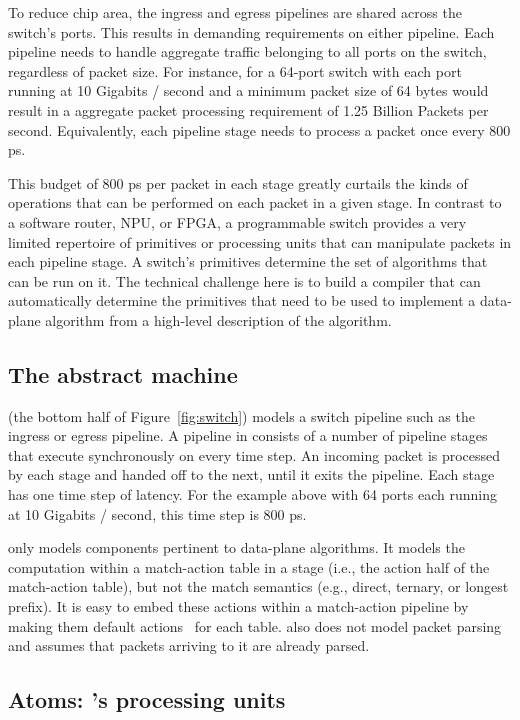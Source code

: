 To reduce chip area, the ingress and egress pipelines are shared across the
switch's ports. This results in demanding requirements on either pipeline.
Each pipeline needs to handle aggregate traffic belonging to all ports on the
switch, regardless of packet size. For instance, for a 64-port switch with each
port running at 10 Gigabits / second and a minimum packet size of 64 bytes
would result in a aggregate packet processing requirement of 1.25 Billion
Packets per second. Equivalently, each pipeline stage needs to process a packet
once every 800 ps.

This budget of 800 ps per packet in each stage greatly curtails the kinds of
operations that can be performed on each packet in a given stage. In contrast
to a software router, NPU, or FPGA, a programmable switch provides a very
limited repertoire of primitives or processing units that can manipulate
packets in each pipeline stage. A switch's primitives determine the set of
algorithms that can be run on it. The technical challenge here is to build a
compiler that can automatically determine the primitives that need to be used
to implement a data-plane algorithm from a high-level description of the
algorithm.

\subsection{The \absmachine abstract machine}

\absmachine (the bottom half of Figure~\ref{fig:switch}) models a switch
pipeline such as the ingress or egress pipeline. A pipeline in \absmachine
consists of a number of pipeline stages that execute synchronously on every
time step. An incoming packet is processed by each stage and handed off to the
next, until it exits the pipeline. Each stage has one time step of latency. For
the example above with 64 ports each running at 10 Gigabits / second, this time
step is 800 ps.

\absmachine only models components pertinent to data-plane algorithms. It
models the computation within a match-action table in a stage (i.e., the action
half of the match-action table), but not the match semantics (e.g., direct,
ternary, or longest prefix). It is easy to embed these actions within a
match-action pipeline by making them default actions~\cite{p4spec} for each
table. \absmachine also does not model packet parsing and assumes that packets
arriving to it are already parsed.

\subsection{Atoms: \absmachine's processing units}

